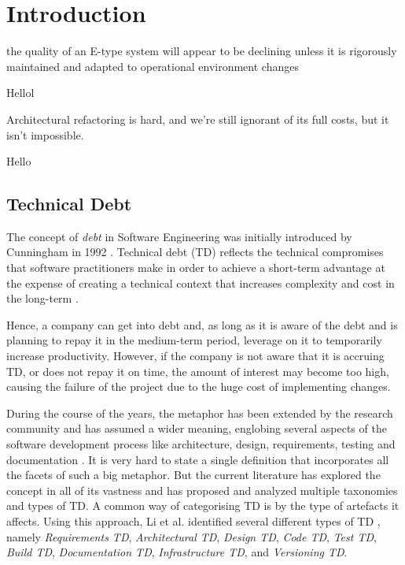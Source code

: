 \chapter{Introduction}\label{chap:introduction}

\epigraph{the quality of an E-type system will appear to be declining unless it is rigorously maintained and adapted to operational environment changes}{Hellol}
\epigraph{Architectural refactoring is hard, and we're still ignorant of its full costs, but it isn't impossible.}{Hello}

\section{Technical Debt}
The concept of \textit{debt} in Software Engineering was initially introduced by Cunningham in 1992 \cite{Cunningham1992}.
Technical debt (TD) reflects the technical compromises that software practitioners make in order to achieve a short-term advantage at the expense of creating a technical context that increases complexity and cost in the long-term \cite{Avgeriou2016}.  

Hence, a company can get into debt and, as long as it is aware of the debt and is planning to repay it in the medium-term period, leverage on it to temporarily increase productivity.
However, if the company is not aware that it is accruing TD, or does not repay it on time, the amount of interest may become too high, causing the failure of the project due to the huge cost of implementing changes.

During the course of the years, the metaphor has been extended by the research community and has assumed a wider meaning, englobing several aspects of the software development process like architecture, design, requirements, testing and documentation \cite{brown_managing_2010}.
It is very hard to state a single definition that incorporates all the facets of such a big metaphor. 
But the current literature has explored the concept in all of its vastness and has proposed and analyzed multiple taxonomies and types of TD.
A common way of categorising TD is by the type of artefacts it affects. Using this approach, Li et al. identified several different types of TD \cite{li_systematic_2015}, namely \emph{Requirements TD}, \emph{Architectural TD}, \emph{Design TD}, \emph{Code TD}, \emph{Test TD}, \emph{Build TD}, \emph{Documentation TD}, \emph{Infrastructure TD}, and \emph{Versioning TD}.


